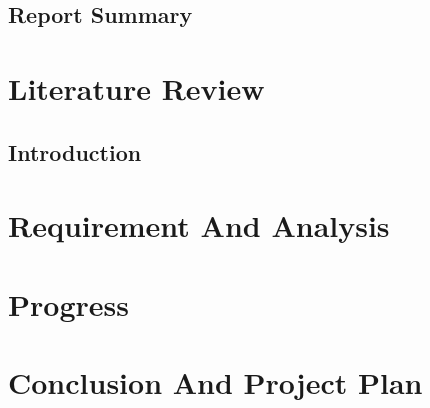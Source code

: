 \documentclass[a4paper,12pt]{book}
\begin{document}
	\section{Report Summary}
		

\chapter{Literature Review}
	\section{Introduction}
	

\chapter{Requirement And Analysis}

\chapter{Progress}

\chapter{Conclusion And Project Plan}


\renewcommand{\bibname}{References}

\end{document}
